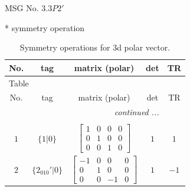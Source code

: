 \documentclass[fleqn,8pt]{jsarticle}
\begin{document}
\setcounter{MaxMatrixCols}{32}

\renewcommand{\tablename}{Table~}
\renewcommand{\figurename}{Figure~}
\begin{center}
\LARGE
MSG No. 3.3\quad$P2'$
\end{center}
* symmetry operation
\renewcommand{\arraystretch}{1.3}
\begin{longtable}{ccccc}
\caption{Symmetry operations for 3d polar vector.}
 \\
 \hline \hline
No. & tag & matrix (polar) & det & TR \\ \hline \endfirsthead

\multicolumn{4}{l}{\tablename\ \thetable{}} \\
 \hline \hline
No. & tag & matrix (polar) & det & TR \\ \hline \endhead

 \hline \hline
\multicolumn{4}{r}{\footnotesize\it continued ...} \\ \endfoot

 \hline \hline
\multicolumn{4}{r}{} \\ \endlastfoot

$ 1 $ & $ \{1|0\} $ & $ \begin{bmatrix} 1 & 0 & 0 & 0 \\ 0 & 1 & 0 & 0 \\ 0 & 0 & 1 & 0 \end{bmatrix} $ & $ 1 $ & $ 1 $ \\ \hline
$ 2 $ & $ \{2{}_{010}{}'|0\} $ & $ \begin{bmatrix} -1 & 0 & 0 & 0 \\ 0 & 1 & 0 & 0 \\ 0 & 0 & -1 & 0 \end{bmatrix} $ & $ 1 $ & $ -1 $ \\
\end{longtable}
\end{document}
